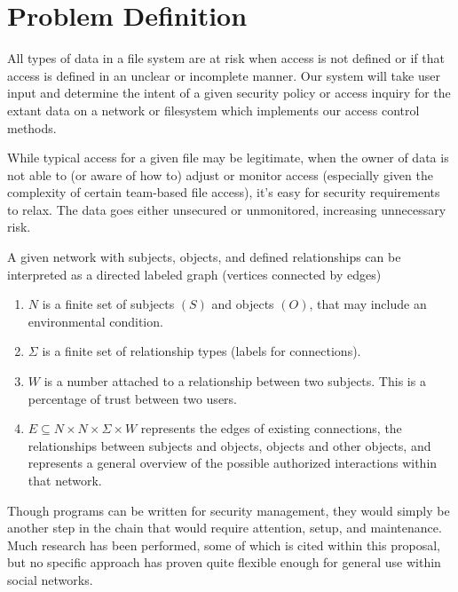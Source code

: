 \documentclass[12pt]{article}
\begin{document}
\section{Problem Definition}
All types of data in a file system are at risk when access is not defined or if that access is defined in an unclear or incomplete manner. Our system will take user input and determine the intent of a given security policy or access inquiry for the extant data on a network or filesystem which implements our access control methods.

While typical access for a given file may be legitimate, when the owner of data is not able to (or aware of how to) adjust or monitor access (especially given the complexity of certain team-based file access), it’s easy for security requirements to relax. The data goes either unsecured or unmonitored, increasing unnecessary risk.

A given network with subjects, objects, and defined relationships can be interpreted as a directed labeled graph (vertices connected by edges)
\begin{enumerate}
    \item $N$ is a finite set of subjects $(S)$ and objects $(O)$, that may include an environmental condition.
    \item $\Sigma$ is a finite set of relationship types (labels for connections).
    \item $W$ is a number attached to a relationship between two subjects. This is a percentage of trust between two users.
    \item $E \subseteq N \times N \times \Sigma \times W$ represents the edges of existing connections, the relationships between subjects and objects, objects and other objects, and represents a general overview of the possible authorized interactions within that network\cite{morovat16}.
\end{enumerate}

Though programs can be written for security management, they would simply be another step in the chain that would require attention, setup, and maintenance. Much research has been performed, some of which is cited within this proposal, but no specific approach has proven quite flexible enough for general use within social networks.
\end{document}
